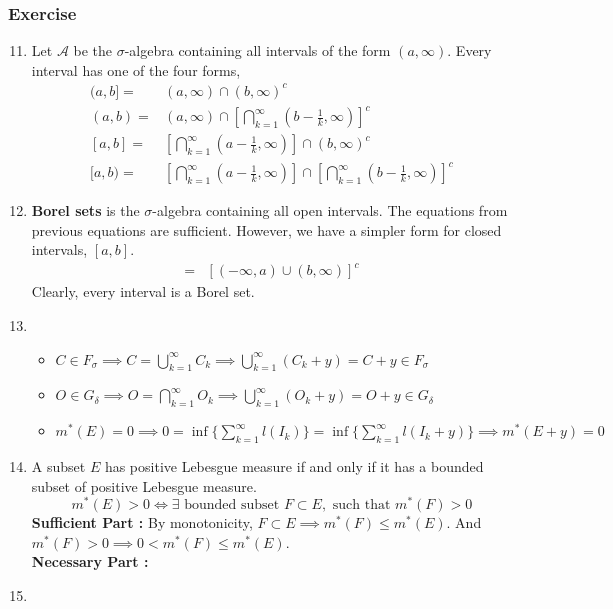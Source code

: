 \subsubsection{Exercise}
\begin{enumerate}
	\setcounter{enumi}{10}
	\item Let $\mathcal{A}$ be the $\sigma$-algebra containing all intervals of the form $(a, \infty)$.
		Every interval has one of the four forms,
	\begin{align}
		(a,b] = & (a,\infty) \cap (b,\infty)^c \\
		(a,b) = & (a,\infty) \cap \left[\bigcap_{k=1}^\infty \left(b-\frac{1}{k},\infty\right)\right]^c \\
		[a,b] = & \left[ \bigcap_{k=1}^\infty \left(a-\frac{1}{k},\infty\right)\right] \cap (b,\infty)^c \\
		[a,b) = & \left[\bigcap_{k=1}^\infty \left(a-\frac{1}{k},\infty\right)\right] \cap \left[ \bigcap_{k=1}^\infty \left(b-\frac{1}{k},\infty\right)\right]^c
	\end{align}
\item \textbf{Borel sets} is the $\sigma$-algebra containing all open intervals.
	The equations from previous equations are sufficient.
	However, we have a simpler form for closed intervals, $[a,b]$.
	\begin{align}
		[a,b] = & \left[(-\infty,a) \cup (b,\infty) \right]^c 
	\end{align}
		Clearly, every interval is a Borel set.
	\item
	\begin{itemize}
		\item $C \in F_\sigma \implies C = \bigcup_{k=1}^\infty C_k \implies \bigcup_{k=1}^\infty \left(C_k+y\right) = C+y \in F_\sigma$
		\item $O \in G_\delta \implies O = \bigcap_{k=1}^\infty O_k \implies \bigcup_{k=1}^\infty \left( O_k+y \right) =  O+y \in G_\delta$
		\item $m^\ast(E) = 0 \implies 0 = \inf\{\sum_{k=1}^\infty l(I_k)\} = \inf\{\sum_{k=1}^\infty l(I_k+y)\} \implies  m^\ast(E+y) = 0$
	\end{itemize}
	\item A subset $E$ has positive Lebesgue measure if and only if it has a bounded subset of positive Lebesgue measure.
		$$m^\ast(E) > 0 \iff \exists \text{ bounded subset }F \subset E,\text{ such that } m^\ast(F) > 0$$
		\textbf{Sufficient Part :} By monotonicity, $F \subset E \implies m^\ast(F) \le m^\ast(E)$.
		And $m^\ast(F) > 0 \implies 0 < m^\ast(F) \le m^\ast(E)$.\\
		\textbf{Necessary Part :}
	\item 
\end{enumerate}

